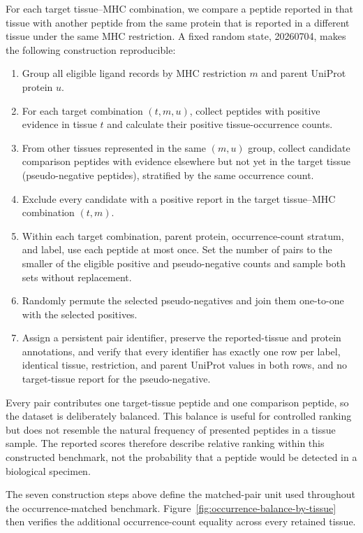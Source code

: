 \documentclass[webpdf,modern,large,nocrop,noinfo]{oup-authoring-template}
\begin{document}
For each target tissue--MHC combination, we compare a peptide reported in that tissue with another peptide from the same protein that is reported in a different tissue under the same MHC restriction. A fixed random state, 20260704, makes the following construction reproducible:

\begin{enumerate}
    \item Group all eligible ligand records by MHC restriction \(m\) and parent UniProt protein \(u\).
    \item For each target combination \((t,m,u)\), collect peptides with positive evidence in tissue \(t\) and calculate their positive tissue-occurrence counts.
    \item From other tissues represented in the same \((m,u)\) group, collect candidate comparison peptides with evidence elsewhere but not yet in the target tissue (pseudo-negative peptides), stratified by the same occurrence count.
    \item Exclude every candidate with a positive report in the target tissue--MHC combination \((t,m)\).
    \item Within each target combination, parent protein, occurrence-count stratum, and label, use each peptide at most once. Set the number of pairs to the smaller of the eligible positive and pseudo-negative counts and sample both sets without replacement.
    \item Randomly permute the selected pseudo-negatives and join them one-to-one with the selected positives.
    \item Assign a persistent pair identifier, preserve the reported-tissue and protein annotations, and verify that every identifier has exactly one row per label, identical tissue, restriction, and parent UniProt values in both rows, and no target-tissue report for the pseudo-negative.
\end{enumerate}

Every pair contributes one target-tissue peptide and one comparison peptide, so the dataset is deliberately balanced. This balance is useful for controlled ranking but does not resemble the natural frequency of presented peptides in a tissue sample. The reported scores therefore describe relative ranking within this constructed benchmark, not the probability that a peptide would be detected in a biological specimen.

The seven construction steps above define the matched-pair unit used throughout the occurrence-matched benchmark. Figure~\ref{fig:occurrence-balance-by-tissue} then verifies the additional occurrence-count equality across every retained tissue.
\end{document}
